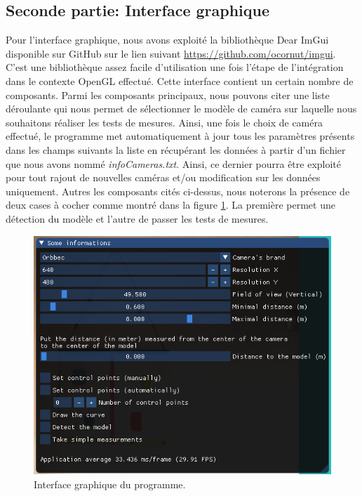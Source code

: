 \documentclass[a4paper, 12pt]{book}
\newcounter{program}[subsection]
\begin{document}
\subsection{Seconde partie: Interface graphique}
Pour l'interface graphique, nous avons exploité la bibliothèque Dear ImGui disponible sur GitHub sur le lien suivant \url{https://github.com/ocornut/imgui}. C'est une bibliothèque assez facile d'utilisation une fois l'étape de l'intégration dans le contexte OpenGL effectué. Cette interface contient un certain nombre de composants. Parmi les composants principaux, nous pouvons citer une liste déroulante qui nous permet de sélectionner le modèle de caméra sur laquelle nous souhaitons réaliser les tests de mesures. Ainsi, une fois le choix de caméra effectué, le programme met automatiquement à jour tous les paramètres présents dans les champs suivants la liste en récupérant les données à partir d'un fichier que nous avons nommé \emph{infoCameras.txt}. Ainsi, ce dernier pourra être exploité pour tout rajout de nouvelles caméras et/ou modification sur les données uniquement.
Autres les composants cités ci-dessus, nous noterons la présence de deux cases à cocher comme montré dans la figure \ref{fig-gui}. La première permet une détection du modèle et l'autre de passer les tests de mesures. 
\begin{center}
	\begin{figure}[htbp]
	  \hspace{3cm}
	 \includegraphics[scale=0.385]{images/GUI.png}
	  \caption{Interface graphique du programme.\label{fig-gui}}
	\end{figure}
\end{center}
\end{document}

